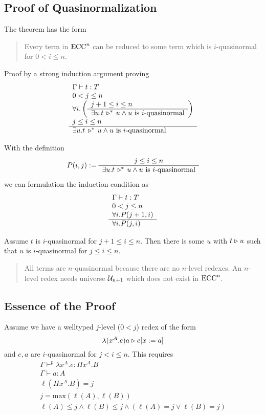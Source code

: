 \subsection{Proof of Quasinormalization}

The theorem has the form
\begin{quote}
  Every term in $\text{ECC}^n$ can be reduced to some term which is $i$-quasinormal
  for $0 < i \le n$.
\end{quote}


Proof by a strong induction argument proving
$$
\begin{array}{l} 
  \Gamma \vdash t : T
  \\
  0 < j \le n
  \\
  \forall i.
  \left(
    \begin{array}{l} j+1 \le i \le n \\ \hline \exists u. t \,\triangleright^*\, u \land u \text{ is $i$-quasinormal}\end{array}
  \right)
  \\
  j \le i \le n
 \\ \hline 
  \exists u. t \,\triangleright^*\, u \land u \text{ is $i$-quasinormal}
\end{array}
$$

With the definition
$$
P(i,j) :=
\begin{array}{c} j \le i \le n \\ \hline \exists u. t \,\triangleright^*\, u \land u \text{ is $i$-quasinormal}\end{array}
$$
%
we can formulation the induction condition as
$$
\begin{array}{l} 
  \Gamma \vdash t : T
  \\
  0 < j \le n
  \\
  \forall i. P(j+1,i)
 \\ \hline 
  \forall i. P(j,i)
\end{array}
$$



Assume $t$ is $i$-quasinormal for $j+1 \le i \le n$. Then there is some $u$
with $t \mathrel{\triangleright} u$ such that $u$ is $i$-quasinormal for $j \le i \le n$.

\begin{quote}
  All terms are $n$-quasinormal because there are no $n$-level redexes. An
  $n$-level redex needs universe ${\cal U}_{n+1}$ which does not exist in $\text{ECC}^n$.
\end{quote}


\subsection{Essence of the Proof}

Assume we have a welltyped $j$-level ($0 < j$) redex of the form
$$
\lambda (x^A.e) a \mathrel{\triangleright} e[x:=a]
$$
and $e,a$ are $i$-quasinormal for $j < i \le n$. This requires
$$
\begin{array}{l}
  \Gamma \vdash^p \lambda x^A.e : \Pi x^A.B
  \\
  \Gamma \vdash a: A
  \\
  \ell(\Pi x^A.B) = j
  \\
  j = \text{max}(\ell(A), \ell(B))
  \\
  \ell(A) \le j \land \ell(B) \le j \land (\ell(A) = j \lor \ell(B) = j)
\end{array}
$$

